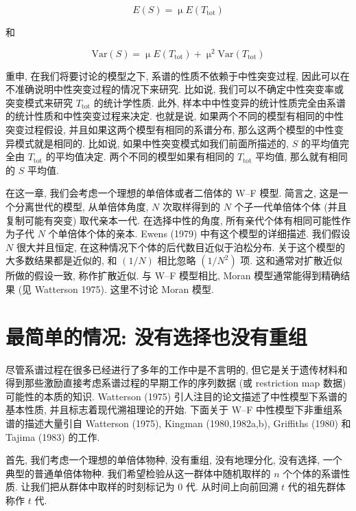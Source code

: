 \documentclass[12pt]{article}
\begin{document}
\begin{equation} \label{eq:1}
    E(S) = \upmu E(T_{\text{tot}})
\end{equation}

和

\begin{equation} \label{eq:2}
    \text{Var}(S) = \upmu E(T_{\text{tot}}) + \upmu ^{2}\text{Var}(T_{\text{tot}})
\end{equation}

重申, 在我们将要讨论的模型之下, 系谱的性质不依赖于中性突变过程, 因此可以在不准确说明中性突变过程的情况下来研究. 比如说,
我们可以不确定中性突变率或突变模式来研究 $T_{\text{tot}}$ 的统计学性质. 此外,
样本中中性变异的统计性质完全由系谱的统计性质和中性突变过程来决定. 也就是说, 如果两个不同的模型有相同的中性突变过程假设,
并且如果这两个模型有相同的系谱分布, 那么这两个模型的中性变异模式就是相同的. 比如说, 如果中性突变模式如我们前面所描述的,
$S$ 的平均值完全由 $T_{\text{tot}}$ 的平均值决定. 两个不同的模型如果有相同的 $T_{\text{tot}}$ 平均值,
那么就有相同的 $S$ 平均值.

在这一章, 我们会考虑一个理想的单倍体或者二倍体的 W--F 模型. 简言之, 这是一个分离世代的模型, 从单倍体角度, $N$
次取样得到的 $N$ 个子一代单倍体个体 (并且复制可能有突变) 取代亲本一代. 在选择中性的角度, 所有亲代个体有相同可能性作为子代
$N$ 个单倍体个体的亲本. Ewens (1979) 中有这个模型的详细描述. 我们假设 $N$ 很大并且恒定,
在这种情况下个体的后代数目近似于泊松分布. 关于这个模型的大多数结果都是近似的, 和 $(1/N)$ 相比忽略 $(1/N^{2})$ 项.
这和通常对扩散近似所做的假设一致, 称作扩散近似. 与 W--F 模型相比, Moran 模型通常能得到精确结果 (见 Watterson 1975).
这里不讨论 Moran 模型.

\section{最简单的情况: 没有选择也没有重组}

尽管系谱过程在很多已经进行了多年的工作中是不言明的, 但它是关于遗传材料和得到那些激励直接考虑系谱过程的早期工作的序列数据 (或
restriction map 数据) 可能性的本质的知识. Watterson (1975) 引人注目的论文描述了中性模型下系谱的基本性质,
并且标志着现代溯祖理论的开始. 下面关于 W--F 中性模型下非重组系谱的描述大量引自 Watterson (1975), Kingman
(1980,1982a,b), Griffiths (1980) 和 Tajima (1983) 的工作.

首先, 我们考虑一个理想的单倍体物种, 没有重组, 没有地理分化, 没有选择, 一个典型的普通单倍体物种.
我们希望检验从这一群体中随机取样的 $n$ 个个体的系谱性质. 让我们把从群体中取样的时刻标记为 0 代. 从时间上向前回溯 $t$
代的祖先群体称作 $t$ 代.
\end{document}
